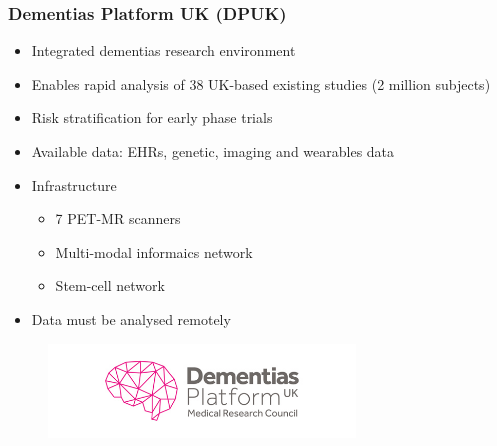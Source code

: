 \documentclass[10pt,xcolor=table]{beamer}
\begin{document}
\begin{frame}
\frametitle{Dementias Platform UK (DPUK)}

\begin{itemize}
\item Integrated dementias research environment
\item Enables rapid analysis of 38 UK-based existing studies (2 million subjects)
\item Risk stratification for early phase trials
\item Available data: EHRs, genetic, imaging and wearables data
\item Infrastructure
\begin{itemize}
 \item 7 PET-MR scanners
 \item Multi-modal informaics network
 \item Stem-cell network
\end{itemize}
\item Data must be analysed remotely

\end{itemize}


\vspace{-1em}
\begin{figure}
\centering
\includegraphics[height=2.5cm,right]{DPUK_logo}   
\end{figure}
\vspace{-4em}

\end{frame}
\end{document}
